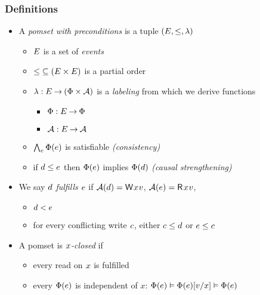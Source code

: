 \documentclass[t,aspectratio=169]{beamer} %
\begin{document}
\begin{frame}
  \frametitle{Definitions}
  \begin{itemize}
  \item 
    A \emph{pomset with preconditions} is a tuple
    $(\Event, {\le}, %
    \labeling)$
    \begin{itemize}
    \item $E$ is a set of \emph{events}
    \item ${\le} \subseteq (E\times E)$ is a partial order
    \item $\lambda: E \mathbin\rightarrow (\Phi\times\mathcal{A})$ is a \emph{labeling}
      from which we derive functions
      \begin{itemize}
      \item $\Phi:E\mathbin\rightarrow\Phi$ %
      \item $\mathcal{A}:E\mathbin\rightarrow\mathcal{A}$  %
      \end{itemize}
    \item<2-> $\bigwedge_{e}\Phi(e)$ is satisfiable
      \emph{(consistency)}
    \item<3-> if $d\le e$ then $\Phi(e)$ implies
      $\Phi(d)$ \emph{(causal strengthening)}
    \end{itemize}
  \item<4->
    We say $d$ \emph{fulfills $e$} if 
    $\labelingAct(\bEv)=\DW{x}{v}$,
    $\labelingAct(\aEv)=\DR{x}{v}$,
    \begin{itemize}
    \item%
      $d < e$
    \item%
      for every conflicting write $c$, either $c \leq d$ or $e \leq c$
    \end{itemize}
  \item<5->
    A pomset is \emph{$x$-closed} if
    \begin{itemize}
    \item every read on $x$ is fulfilled
    \item every $\Phi(e)$ is independent of $x$: $\Phi(e) \vDash \Phi(e)[v/x] \vDash
      \Phi(e)$
    \end{itemize}
  \end{itemize}
\end{frame}
\end{document}
